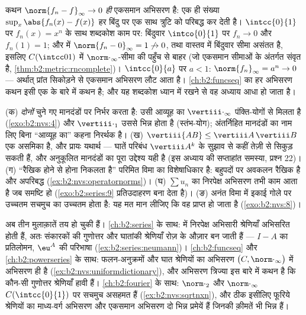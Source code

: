 \begin{example}\label{ex:b2:nvs:uniformdictionary}
कथन $\norm{f_n - f}_\infty \to 0$ \emph{ही} एकसमान अभिसरण है: एक ही संख्या $\sup_x\abs{f_n(x) - f(x)}$ हर बिंदु पर एक
साथ त्रुटि को परिबद्ध कर देती है। $\intcc{0}{1}$ पर $f_n(x) = x^n$ के साथ शब्दकोश काम पर:
बिंदुवार $\intco{0}{1}$ पर $f_n
\to 0$ और $f_n(1) = 1$; और  में $\norm{f_n - 0}_\infty = 1 \not\to 0$, तथा वास्तव में बिंदुवार
सीमा असंतत है, इसलिए $C(\intcc01)$ में $\norm\cdot_\infty$-सीमा की पहुँच से बाहर (जो
एकसमान सीमाओं के अंतर्गत संवृत है, \cref{thm:b2:metric:rncomplete})। $\intcc{0}{a}$ पर $a < 1$: $\norm{f_n}_\infty = a^n \to 0$ ---
अर्थात् प्रांत सिकोड़ने से एकसमान अभिसरण लौट आता है। \cref{ch:b2:funcseq} का हर अभिसरण
कथन इसी एक  के बारे में कथन है; और यह शब्दकोश ध्यान में रखने से
वह अध्याय आधा हो जाता है।
\end{example}

\begin{remark}[सामान्य भूलें]\label{rem:b2:nvs:pitfalls}
(क)  \emph{दोनों} चुने गए मानदंडों पर निर्भर करता है: उसी
आव्यूह का $\vertiii\cdot_\infty$ पंक्ति-योगों से मिलता है (\cref{exo:b2:nvs:4}) और $\vertiii\cdot_1$ उससे भिन्न होता है
(स्तंभ-योग); अंतर्निहित मानदंडों का नाम लिए बिना ``आव्यूह का'' 
कहना निरर्थक है। (ख) $\vertiii{AB} \leq
\vertiii A\,\vertiii B$ एक असमिका है, और प्रायः यथार्थ --- घातें
परिबंध $\vertiii A^k$ के सुझाव से कहीं तेज़ी से सिकुड़ सकती हैं, और अनुकूलित
मानदंडों का पूरा उद्देश्य यही है (इस अध्याय की सप्ताहांत समस्या, प्रश्न
22)। (ग) ``रैखिक होने से  होना निकलता है'' परिमित विमा का
विशेषाधिकार है: बहुपदों पर अवकलन रैखिक है और अपरिबद्ध (\cref{ex:b2:nvs:operatornorms})। (घ) $\sum u_n$ का
निरपेक्ष अभिसरण तभी काम आता है जब समष्टि  हो (\cref{exo:b2:series:9} प्रतिउदाहरण बना
देता है)। (ङ) अनंत विमा में इकाई गोले पर उच्चतम सचमुच का उच्चतम होता
है: यह मत मान लीजिए कि वह प्राप्त हो जाता है (\cref{exo:b2:nvs:8})।
\end{remark}

\begin{remark}[इसी खंड के भीतर के परिप्रेक्ष्य]\label{rem:b2:nvs:perspectives}
अब तीन मुलाक़ातें तय हो चुकी हैं। \cref{ch:b2:series} के साथ:  में निरपेक्ष
अभिसारी श्रेणियाँ अभिसरित होती हैं, अतः संकारकों की गुणोत्तर और घातांकी
श्रेणियाँ रोज़ के औज़ार बन जाती हैं --- $I - A$ का प्रतिलोमन, $\eu^{A}$ की
परिभाषा (\cref{ex:b2:series:neumann})। \cref{ch:b2:funcseq} और \cref{ch:b2:powerseries} के साथ: फलन-अनुक्रमों और घात श्रेणियों का
अभिसरण $\bigl(C, \norm\cdot_\infty\bigr)$ में अभिसरण ही है (\cref{ex:b2:nvs:uniformdictionary}), और अभिसरण त्रिज्या इस बारे में कथन
है कि कौन-सी गुणोत्तर श्रेणियाँ हावी हैं। \cref{ch:b2:fourier} के साथ:  $\norm\cdot_2$ और
$\norm\cdot_\infty$ $C(\intcc{0}{1})$ पर सचमुच असहमत हैं (\cref{ex:b2:nvs:sqrtnxn}), और ठीक इसीलिए फूरिये श्रेणियों का
माध्य-वर्ग अभिसरण और एकसमान अभिसरण दो भिन्न प्रमेयें हैं जिनकी क़ीमतें
भी भिन्न हैं।
\end{remark}

